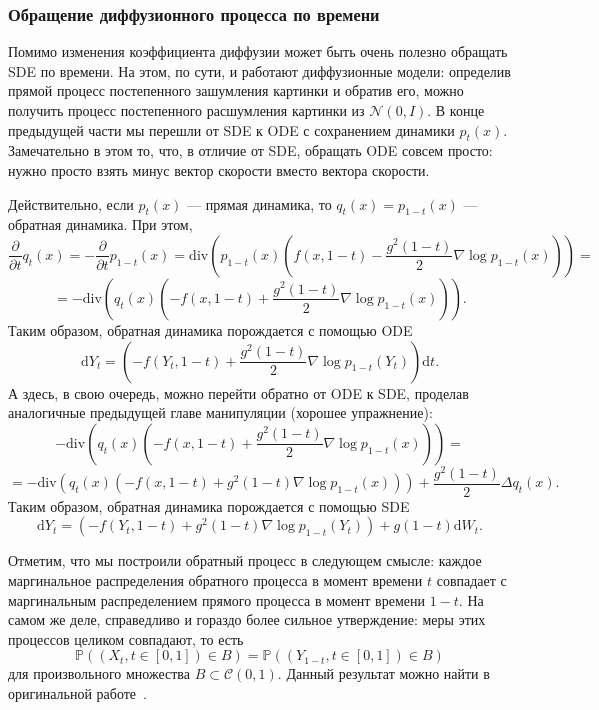 \documentclass[12pt]{article}
\theoremstyle{definition}
\begin{document}
\subsubsection{Обращение диффузионного процесса по времени}
Помимо изменения коэффициента диффузии может быть очень полезно обращать SDE по времени. На этом, по сути, и работают диффузионные модели: определив прямой процесс постепенного зашумления картинки и обратив его, можно получить процесс постепенного расшумления картинки из $\mathcal{N}(0, I)$.
В конце предыдущей части мы перешли от SDE к ODE с сохранением динамики $p_t(x)$. Замечательно в этом то, что, в отличие от SDE, обращать ODE совсем просто: нужно просто взять минус вектор скорости вместо вектора скорости.

Действительно, если $p_t(x)$ --- прямая динамика, то $q_t(x) = p_{1 - t}(x)$ --- обратная динамика. При этом,
\[
    \frac{\partial}{\partial t} q_t(x) = -\frac{\partial}{\partial t} p_{1 - t}(x) = \text{div}\left(p_{1 - t}(x) \left(f(x, 1 - t) - \frac{g^2(1-t)}{2}\nabla \log p_{1-t}(x)\right)\right) = 
\]
\[
    = -\text{div}\left(q_t(x) \left(-f(x, 1 - t) + \frac{g^2(1-t)}{2}\nabla \log p_{1-t}(x)\right)\right).
\]
Таким образом, обратная динамика порождается с помощью ODE
\[
    \mathrm{d} Y_t = \left(-f(Y_t, 1-t) + \frac{g^2(1-t)}{2} \nabla \log p_{1-t}(Y_t)\right)\mathrm{d} t.
\]
А здесь, в свою очередь, можно перейти обратно от ODE к SDE, проделав аналогичные предыдущей главе манипуляции (хорошее упражнение):
\[
    -\text{div}\left(q_t(x) \left(-f(x, 1 - t) + \frac{g^2(1-t)}{2}\nabla \log p_{1-t}(x)\right)\right) = 
\]
\[
    = -\text{div}  \left(q_t(x)\left(-f(x, 1-t) + g^2(1-t) \nabla \log p_{1 - t}(x) \right)\right) + \frac{g^2(1-t)}{2}\Delta q_t(x).
\]
Таким образом, обратная динамика порождается с помощью SDE
\[
    \mathrm{d} Y_t = \left(-f(Y_t, 1 -t) + g^2(1 - t) \nabla \log p_{1 - t}(Y_t)\right) + g(1-t) \mathrm{d} W_t.
\]

Отметим, что мы построили обратный процесс в следующем смысле: каждое маргинальное распределения обратного процесса в момент времени $t$ совпадает с маргинальным распределением прямого процесса в момент времени $1 - t$. На самом же деле, справедливо и гораздо более сильное утверждение: меры этих процессов целиком совпадают, то есть
\[
    \mathbb{P}((X_t, t \in [0, 1]) \in B) =     \mathbb{P}((Y_{1 - t}, t \in [0, 1]) \in B)
\]
для произвольного множества $B \subset \mathcal{C}(0, 1)$. Данный результат можно найти в оригинальной работе~\cite{anderson1982reverse}.
\end{document}
